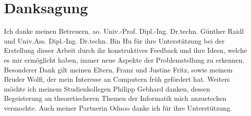 \chapter*{Danksagung}

Ich danke meinen Betreuern, ao. Univ.-Prof. Dipl.-Ing. Dr.techn. Günther Raidl und Univ.Ass. Dipl.-Ing. Dr.techn. Bin Hu für ihre Unterstützung bei der Erstellung dieser Arbeit durch ihr konstruktives Feedback und ihre Ideen, welche es mir ermöglicht haben, immer neue Aspekte der Problemstellung zu erkennen.\\

Besonderer Dank gilt meinen Eltern, Franz und Justine Fritz, sowie meinem Bruder Wolfi, der mein Interesse an Computern früh gefördert hat. Weiters möchte ich meinem Studienkollegen Philipp Gebhard danken, dessen Begeisterung an theoretischeren Themen der Informatik mich anzustecken vermochte. Auch meiner Partnerin Odnoo danke ich für ihre Unterstützung.